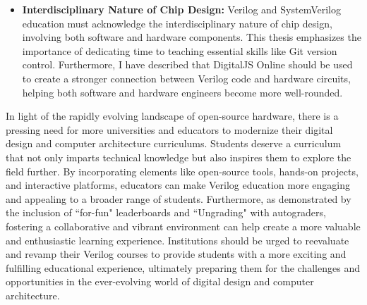 \begin{itemize}
    \item \textbf{Interdisciplinary Nature of Chip Design:} Verilog and SystemVerilog education must acknowledge the interdisciplinary nature of chip design, involving both software and hardware components. This thesis emphasizes the importance of dedicating time to teaching essential skills like Git version control. Furthermore, I have described that DigitalJS Online should be used to create a stronger connection between Verilog code and hardware circuits, helping both software and hardware engineers become more well-rounded.
\end{itemize}

In light of the rapidly evolving landscape of open-source hardware, there is a pressing need for more universities and educators to modernize their digital design and computer architecture curriculums. Students deserve a curriculum that not only imparts technical knowledge but also inspires them to explore the field further. By incorporating elements like open-source tools, hands-on projects, and interactive platforms, educators can make Verilog education more engaging and appealing to a broader range of students. Furthermore, as demonstrated by the inclusion of ``for-fun" leaderboards and ``Ungrading" with autograders, fostering a collaborative and vibrant environment can help create a more valuable and enthusiastic learning experience. Institutions should be urged to reevaluate and revamp their Verilog courses to provide students with a more exciting and fulfilling educational experience, ultimately preparing them for the challenges and opportunities in the ever-evolving world of digital design and computer architecture.
